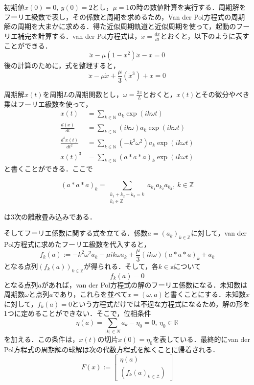 \documentclass[11pt,a4paper,titlepage]{jsreport}
\theoremstyle{definition}
\begin{document}
初期値$x(0)=0,\ y(0)=2$とし，$\mu=1$の時の数値計算を実行する．周期解をフーリエ級数で表し，その係数と周期を求めるため，Van der Pol方程式の周期解の周期を大まかに求める．得た近似周期軌道と近似周期を使って，起動のフーリエ補完を計算する．van der Pol方程式は，$\dot{x}=\frac{dx}{dt}$とおくと，以下のように表すことができる．
\begin{equation*}
  \ddot{x} - \mu (1-x^2)\dot{x} - x = 0
\end{equation*}
後の計算のために，式を整理すると，
\begin{equation*}
  \ddot{x} - \mu \dot{x} + \frac{\mu}{3} \left(\dot{x}^3\right) + x = 0
\end{equation*}

周期解$x(t)$を周期$L$の周期関数とし，$\omega = \frac{2\pi}{L}$とおくと，$x(t)$とその微分やべき乗はフーリエ級数を使って，
\begin{align*}
  x(t)                 & = \sum_{k\in\mathbb{N}} a_k \exp(ik \omega t)                \\
  \frac{d(x)}{dt}      & = \sum_{k\in\mathbb{N}} (ik \omega) a_k \exp(ik \omega t)    \\
  \frac{d^2x(t)}{dt^2} & = \sum_{k\in\mathbb{N}} (-k^2\omega^2) a_k \exp(ik \omega t) \\
  x(t)^3               & = \sum_{k\in\mathbb{N}} (a*a*a)_k \exp(ik \omega t)
\end{align*}
と書くことができる．ここで

\begin{equation*}
  (a*a*a)_k = \sum_{\substack{k_1+k_2+k_3=k\\k_i\in\mathbb{Z}}} a_{k_1}a_{k_2}a_{k_3},\ k\in\mathbb{Z}
\end{equation*}

は3次の離散畳み込みである．

そしてフーリエ係数に関する式を立てる．係数$a=\left(a_k\right)_{k\in\mathbb{Z}}$に対して，van der Pol方程式に求めたフーリエ級数を代入すると，
\begin{equation*}
  f_k(a) := -k^2\omega^2 a_k - \mu ik \omega a_k + \frac{\mu}{3} (ik \omega)(a*a*a)_k + a_k
\end{equation*}
となる点列$(f_k(a))_{k\in\mathbb{Z}}$が得られる．そして，各$k\in\mathbb{z}$について
\begin{equation*}
  f_k(a) = 0
\end{equation*}
となる点列$a$があれば，van der Pol方程式の解のフーリエ係数になる．未知数は周期数$\omega$と点列$a$であり，これらを並べて$x=(\omega,a)$と書くことにする．未知数$x$に対して，$f_k(a)=0$という方程式だけでは不逞な方程式になるため，解の形を1つに定めることができない．そこで，位相条件
\begin{equation*}
  \eta(a) = \sum_{|k|\in N} a_k-\eta_0 = 0,\ \eta_0\in\mathbb{R}
\end{equation*}
を加える．この条件は，$x(t)$の切片$x(0)=\eta_0$を表している．最終的にvan der Pol方程式の周期解の球解は次の代数方程式を解くことに帰着される．
\begin{equation*}
  F(x) := \begin{bmatrix}
    \eta(a) \\
    \left(f_k(a)_{k\in\mathcal{Z}}\right)
  \end{bmatrix}
\end{equation*}
\end{document}
